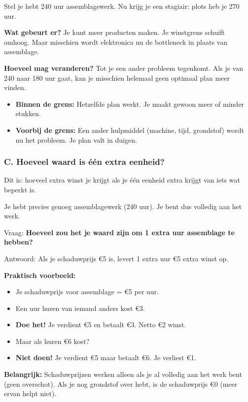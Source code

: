 \documentclass[a4paper,11pt]{article}
\begin{document}
Stel je hebt 240 uur assemblagewerk. Nu krijg je een stagiair: plots heb je 270 uur.

\textbf{Wat gebeurt er?} Je kunt meer producten maken. 
Je winstgrens schuift omhoog. Maar misschien wordt elektronica nu de bottleneck in plaats van assemblage.

\textbf{Hoeveel mag veranderen?} Tot je een ander probleem tegenkomt. Als je van 240 naar 180 uur gaat, kan je misschien helemaal geen optimaal plan meer vinden.

\begin{itemize}
    \item \textbf{Binnen de grens:} Hetzelfde plan werkt. Je maakt gewoon meer of minder stukken.
    \item \textbf{Voorbij de grens:} Een ander hulpmiddel (machine, tijd, grondstof) wordt nu het probleem. Je plan valt in duigen.
\end{itemize}

\subsubsection{C. Hoeveel waard is één extra eenheid?}

\begin{conceptbox}[title=Schaduwprijs (Shadow Price)]
Dit is: hoeveel extra winst je krijgt als je één eenheid extra krijgt van iets wat beperkt is.
\end{conceptbox}

Je hebt precies genoeg assemblagewerk (240 uur). Je bent dus volledig aan het werk.

Vraag: \textbf{Hoeveel zou het je waard zijn om 1 extra uur assemblage te hebben?}

Antwoord: Als je schaduwprijs €5 is, levert 1 extra uur €5 extra winst op.

\textbf{Praktisch voorbeeld:}
\begin{itemize}
    \item Je schaduwprijs voor assemblage = €5 per uur.
    \item Een uur huren van iemand anders kost €3.
    \item \textbf{Doe het!} Je verdient €5 en betaalt €3. Netto €2 winst.
    \item Maar als huren €6 kost?
    \item \textbf{Niet doen!} Je verdient €5 maar betaalt €6. Je verliest €1.
\end{itemize}

\textbf{Belangrijk:} Schaduwprijzen werken alleen als je al volledig aan het werk bent (geen overschot). Als je nog grondstof over hebt, is de schaduwprijs €0 (meer ervan helpt niet).
\end{document}
